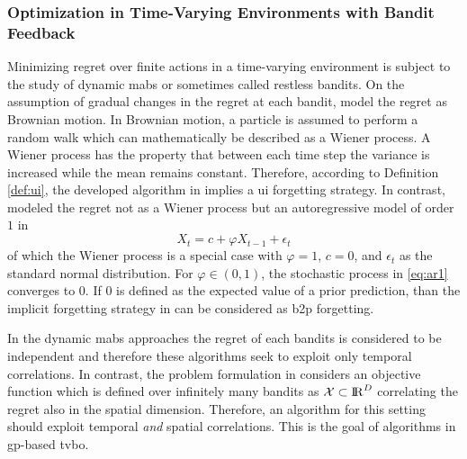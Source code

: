\subsubsection{Optimization in Time-Varying Environments with Bandit Feedback}

Minimizing regret over finite actions in a time-varying environment is subject to the study of dynamic \glspl{mab} or sometimes called restless bandits. On the assumption of gradual changes in the regret at each bandit, \textcite{Slivkins_2008} model the regret as Brownian motion. In Brownian motion, a particle is assumed to perform a random walk which can mathematically be described as a Wiener process. A Wiener process has the property that between each time step the variance is increased while the mean remains constant. Therefore, according to Definition \ref{def:ui}, the developed algorithm in \textcite{Slivkins_2008} implies a \gls{ui} forgetting strategy. In contrast, \textcite{Chen_2021} modeled the regret not as a Wiener process but an autoregressive model of order $1$ in
\begin{equation}
    X_{t}=c+ \varphi X_{t-1}+\epsilon_{t}
    \label{eq:ar1}
\end{equation}
of which the Wiener process is a special case with $\varphi=1$, $c=0$, and $\epsilon_{t}$ as the standard normal distribution. For $\varphi \in (0,1)$, the stochastic process in \eqref{eq:ar1} converges to $0$. If $0$ is defined as the expected value of a prior prediction, than the implicit forgetting strategy in \textcite{Chen_2021} can be considered as \gls{b2p} forgetting.

In the dynamic \glspl{mab} approaches the regret of each bandits is considered to be independent and therefore these algorithms seek to exploit only temporal correlations. In contrast, the problem formulation in  considers an objective function which is defined over infinitely many bandits as $\mathcal{X} \subset \mathrm{I\!R}^D$ correlating the regret also in the spatial dimension. Therefore, an algorithm for this setting should exploit temporal \emph{and} spatial correlations. This is the goal of algorithms in \gls{gp}-based \gls{tvbo}.

